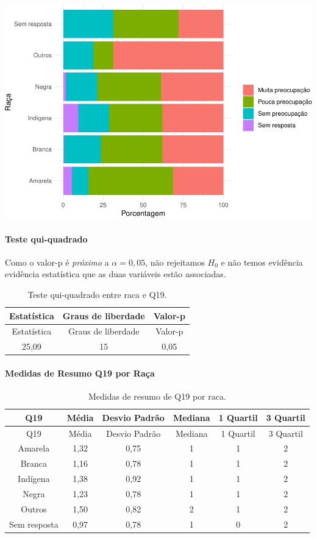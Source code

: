 \documentclass[]{article}
\let\oldparagraph\paragraph
\renewcommand{\paragraph}[1]{\oldparagraph{#1}\mbox{}}
\begin{document}
\begin{center}\includegraphics[width=0.75\linewidth]{relatorio_files/figure-latex/unnamed-chunk-272-1} \end{center}

\hypertarget{teste-qui-quadrado-30}{%
\paragraph{Teste qui-quadrado}\label{teste-qui-quadrado-30}}

Como o valor-p é \emph{próximo} a \(\alpha=0,05\), não rejeitamos \(H_0\) e não temos evidência evidência estatística que as duas variáveis estão associadas.

\begin{longtable}[]{@{}ccc@{}}
\caption{\label{tab:unnamed-chunk-273}Teste qui-quadrado entre raca e Q19.}\tabularnewline
\toprule
Estatística & Graus de liberdade & Valor-p\tabularnewline
\midrule
\endfirsthead
\toprule
Estatística & Graus de liberdade & Valor-p\tabularnewline
\midrule
\endhead
25,09 & 15 & 0,05\tabularnewline
\bottomrule
\end{longtable}

\cleardoublepage

\hypertarget{medidas-de-resumo-q19-por-rauxe7a}{%
\paragraph{Medidas de Resumo Q19 por Raça}\label{medidas-de-resumo-q19-por-rauxe7a}}

\begin{longtable}[]{@{}cccccc@{}}
\caption{\label{tab:unnamed-chunk-274}Medidas de resumo de Q19 por raca.}\tabularnewline
\toprule
Q19 & Média & Desvio Padrão & Mediana & 1 Quartil & 3 Quartil\tabularnewline
\midrule
\endfirsthead
\toprule
Q19 & Média & Desvio Padrão & Mediana & 1 Quartil & 3 Quartil\tabularnewline
\midrule
\endhead
Amarela & 1,32 & 0,75 & 1 & 1 & 2\tabularnewline
Branca & 1,16 & 0,78 & 1 & 1 & 2\tabularnewline
Indígena & 1,38 & 0,92 & 1 & 1 & 2\tabularnewline
Negra & 1,23 & 0,78 & 1 & 1 & 2\tabularnewline
Outros & 1,50 & 0,82 & 2 & 1 & 2\tabularnewline
Sem resposta & 0,97 & 0,78 & 1 & 0 & 2\tabularnewline
\bottomrule
\end{longtable}
\end{document}
